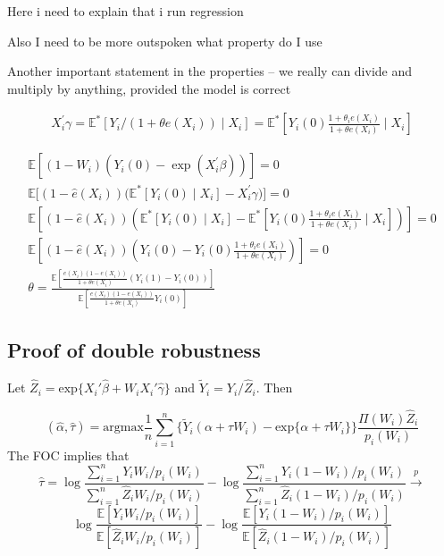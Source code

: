 \documentclass[a4paper,12pt]{article}
\theoremstyle{plain}
\begin{document}
Here i need to explain that i run regression

Also I need to be more outspoken what property do I use

Another important statement in the properties -- we really can divide and multiply by anything, provided the model is correct

\begin{gather*}
X_i^\prime\gamma = \mathbb{E}^\ast[Y_i / (1 + \theta e(X_i))\mid X_i] = \mathbb{E}^\ast\left[Y_i(0) \frac{1 + \theta_i e(X_i)}{1 + \theta e(X_i)}\mid X_i\right]
\end{gather*}

    \begin{gather*}
        \mathbb{E}[(1 - W_i)(Y_i(0) - \exp(X_i^\prime\beta))] = 0 \\
        \mathbb{E}\Big[(1 - \hat e(X_i))\Big(\mathbb{E}^\ast[Y_i(0) \mid X_i] - X_i^\prime \gamma \Big)\Big] = 0 \\
        \mathbb{E}\left[(1 - \hat e(X_i))\left(\mathbb{E}^\ast[Y_i(0) \mid X_i] - \mathbb{E}^\ast\left[Y_i(0)\frac{1 + \theta_i e(X_i)}{1 + \theta e(X_i)} \mid X_i\right]\right)\right] = 0 \\
        \mathbb{E}\left[(1 - \hat e(X_i))\left(Y_i(0) - Y_i(0)\frac{1 + \theta_i e(X_i)}{1 + \theta e(X_i)}\right)\right] = 0 \\
        \theta = \frac{\mathbb{E}\left[\frac{e(X_i)(1 - e(X_i))}{1 + \theta e(X_i)}(Y_i(1) - Y_i(0))\right]}{\mathbb{E}\left[\frac{e(X_i)(1 - e(X_i))}{1 + \theta e(X_i)}Y_i(0)\right]}
    \end{gather*}


\subsection{Proof of double robustness}
\label{proof:aipw}
Let $\hat Z_i = \mathrm{exp}\{X_i' \hat\beta + W_i X_i' \hat\gamma\}$ and $\tilde{Y}_i = Y_i / \hat Z_i$. Then 

$$(\hat{\alpha}, \hat{\tau}) = \mathrm{argmax}\frac{1}{n}\sum_{i=1}^{n}\{\tilde{Y}_i (\alpha + \tau W_i) - \mathrm{exp}\{\alpha + \tau W_i\}\}\frac{\Pi(W_i)\hat Z_i}{p_i(W_i)}$$
The FOC implies that 
$$\hat{\tau} = \log\frac{\sum_{i=1}^{n}Y_i W_i / p_i(W_i)}{\sum_{i=1}^{n}\hat Z_i W_i / p_i(W_i)} - \log \frac{\sum_{i=1}^{n}Y_i (1 - W_i) / p_i(W_i)}{\sum_{i=1}^{n}\hat Z_i (1 - W_i) / p_i(W_i)} \stackrel{p}{\to}$$
$$\log\frac{\mathbb{E}[Y_i W_i / p_i(W_i)]}{\mathbb{E}[\hat Z_i W_i / p_i(W_i)]} - \log \frac{\mathbb{E}[Y_i (1 - W_i) / p_i(W_i)]}{\mathbb{E}[\hat Z_i (1 - W_i) / p_i(W_i)]}$$
\end{document}
